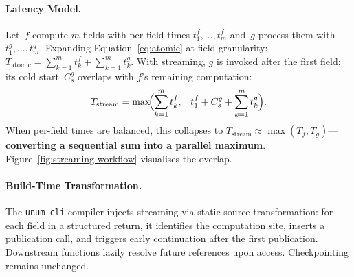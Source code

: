 \documentclass[runningheads]{llncs}
\begin{document}
\paragraph{Latency Model.}
Let~$f$ compute $m$ fields with per-field times $t_1^f, \dots, t_m^f$ and~$g$ process them with $t_1^g, \dots, t_m^g$. Expanding Equation~\eqref{eq:atomic} at field granularity: $T_{\text{atomic}} = \sum_{k=1}^{m} t_k^f + \sum_{k=1}^{m} t_k^g$.
With streaming, $g$ is invoked after the first field; its cold start~$C_s^g$ overlaps with $f$'s remaining computation:
\begin{equation}
T_{\text{stream}} = \max\!\Bigl(\sum_{k=1}^{m} t_k^f,\;\;\; t_1^f + C_s^g + \sum_{k=1}^{m} t_k^g\Bigr).
\label{eq:stream}
\end{equation}
When per-field times are balanced, this collapses to $T_{\text{stream}} \approx \max(T_f, T_g)$---\textbf{converting a sequential sum into a parallel maximum}. Figure~\ref{fig:streaming-workflow} visualises the overlap.

\paragraph{Build-Time Transformation.}
The \texttt{unum-cli} compiler injects streaming via static source transformation: for each field in a structured return, it identifies the computation site, inserts a publication call, and triggers early continuation after the first publication. Downstream functions lazily resolve future references upon access. Checkpointing remains unchanged.
\end{document}
